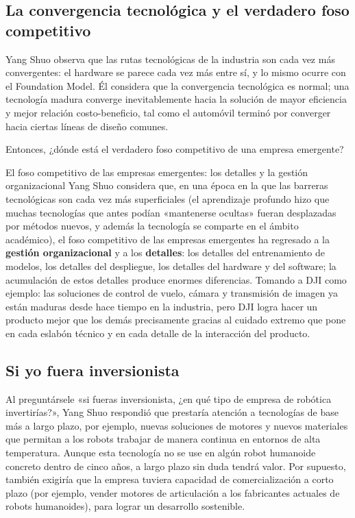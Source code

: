 \subsection{La convergencia tecnológica y el verdadero foso competitivo}

Yang Shuo observa que las rutas tecnológicas de la industria son cada vez más convergentes: el hardware se parece cada vez más entre sí, y lo mismo ocurre con el Foundation Model. Él considera que la convergencia tecnológica es normal; una tecnología madura converge inevitablemente hacia la solución de mayor eficiencia y mejor relación costo-beneficio, tal como el automóvil terminó por converger hacia ciertas líneas de diseño comunes.

Entonces, ¿dónde está el verdadero foso competitivo de una empresa emergente?

\begin{importantbox}{El foso competitivo de las empresas emergentes: los detalles y la gestión organizacional}
Yang Shuo considera que, en una época en la que las barreras tecnológicas son cada vez más superficiales (el aprendizaje profundo hizo que muchas tecnologías que antes podían «mantenerse ocultas» fueran desplazadas por métodos nuevos, y además la tecnología se comparte en el ámbito académico), el foso competitivo de las empresas emergentes ha regresado a la \textbf{gestión organizacional} y a los \textbf{detalles}: los detalles del entrenamiento de modelos, los detalles del despliegue, los detalles del hardware y del software; la acumulación de estos detalles produce enormes diferencias. Tomando a DJI como ejemplo: las soluciones de control de vuelo, cámara y transmisión de imagen ya están maduras desde hace tiempo en la industria, pero DJI logra hacer un producto mejor que los demás precisamente gracias al cuidado extremo que pone en cada eslabón técnico y en cada detalle de la interacción del producto.
\end{importantbox}

\subsection{Si yo fuera inversionista}

Al preguntársele «si fueras inversionista, ¿en qué tipo de empresa de robótica invertirías?», Yang Shuo respondió que prestaría atención a tecnologías de base más a largo plazo, por ejemplo, nuevas soluciones de motores y nuevos materiales que permitan a los robots trabajar de manera continua en entornos de alta temperatura. Aunque esta tecnología no se use en algún robot humanoide concreto dentro de cinco años, a largo plazo sin duda tendrá valor. Por supuesto, también exigiría que la empresa tuviera capacidad de comercialización a corto plazo (por ejemplo, vender motores de articulación a los fabricantes actuales de robots humanoides), para lograr un desarrollo sostenible.

